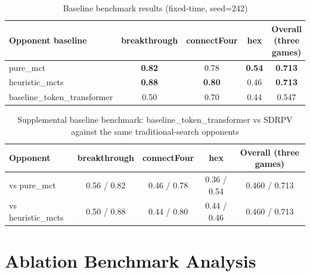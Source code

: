\begin{table}[htbp]
\centering
\caption{Baseline benchmark results (fixed-time, seed=242)}
\label{tab:baseline_benchmark_seed242}
\begin{tabular}{lcccc}
\toprule
Opponent baseline & breakthrough & connectFour & hex & Overall (three games) \\
\midrule
pure\_mct & \textbf{0.82} & 0.78 & \textbf{0.54} & \textbf{0.713} \\
heuristic\_mcts & \textbf{0.88} & \textbf{0.80} & 0.46 & \textbf{0.713} \\
baseline\_token\_transformer & 0.50 & 0.70 & 0.44 & 0.547 \\
\bottomrule
\end{tabular}
\end{table}
\begin{table}[htbp]
\centering
\caption{Supplemental baseline benchmark: baseline\_token\_transformer vs SDRPV against the same traditional-search opponents}
\label{tab:supplement_baseline_compare}
\begin{tabular}{lcccc}
\toprule
Opponent & breakthrough & connectFour & hex & Overall (three games) \\
\midrule
vs pure\_mct & 0.56 / 0.82 & 0.46 / 0.78 & 0.36 / 0.54 & 0.460 / 0.713 \\
vs heuristic\_mcts & 0.50 / 0.88 & 0.44 / 0.80 & 0.44 / 0.46 & 0.460 / 0.713 \\
\bottomrule
\end{tabular}
\end{table}


\section{Ablation Benchmark Analysis}


